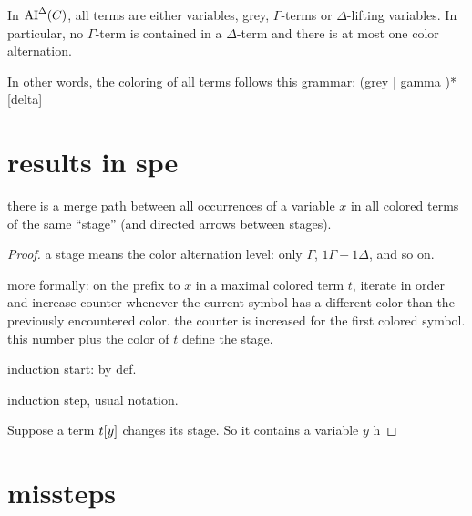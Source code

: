 \documentclass[,%
	paper=a4,%
	DIV10, %
	twoside=false,%
	liststotoc,
	bibtotoc,
	draft=false,%
	numbers=noendperiod
]{scrartcl}
\begin{document}
\begin{prop}
	\label{prop:no_delta_term_in_ai_delta}
	In $\operatorname{AI}^\Delta(C)$, all terms are either variables, grey, $\Gamma$-terms or $\Delta$-lifting variables. 
	In particular, no $\Gamma$-term is contained in a $\Delta$-term and there is at most one color alternation. 

	In other words, the coloring of all terms follows this grammar:
	(grey | gamma )* [delta]

\end{prop}
\section{results in spe}

\begin{clemma}
	there is a merge path between all occurrences of a variable $x$ in all colored terms of the same ``stage'' (and directed arrows between stages).
\end{clemma}
\begin{proof}
	a stage means the color alternation level: only $\Gamma$, $1 \Gamma + 1 \Delta$, and so on.

	more formally: on the prefix to $x$ in a maximal colored term $t$, iterate in order and increase counter whenever the current symbol has a different color than the previously encountered color. the counter is increased for the first colored symbol. this number plus the color of $t$ define the stage.

	induction start: by def.

	induction step, usual notation.

	Suppose a term $t[y]$ changes its stage. 
	So it contains a variable $y$ h





\end{proof}



\section{missteps}
\end{document}
